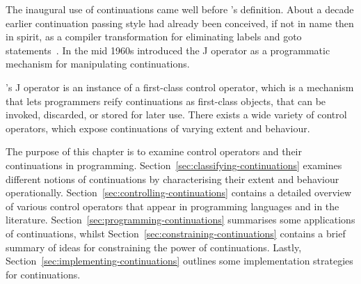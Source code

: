 \documentclass[12pt,phd,lfcs,twoside,openright,logo,leftchapter,normalheadings]{infthesis}
\theoremstyle{plain}
\theoremstyle{definition}
\begin{document}
The inaugural use of continuations came well before
\citeauthor{StracheyW00}'s definition. About a decade earlier
continuation passing style had already been conceived, if not in name
then in spirit, as a compiler transformation for eliminating labels
and goto statements~\cite{Reynolds93}. In the mid 1960s
\citet{Landin98} introduced the J operator as a programmatic mechanism
for manipulating continuations.

\citeauthor{Landin98}'s J operator is an instance of a first-class
control operator, which is a mechanism that lets programmers reify
continuations as first-class objects, that can be invoked, discarded,
or stored for later use. There exists a wide variety of control
operators, which expose continuations of varying extent and behaviour.

The purpose of this chapter is to examine control operators and their
continuations in
programming. Section~\ref{sec:classifying-continuations} examines
different notions of continuations by characterising their extent and
behaviour operationally. Section~\ref{sec:controlling-continuations}
contains a detailed overview of various control operators that appear
in programming languages and in the
literature. Section~\ref{sec:programming-continuations} summarises
some applications of continuations, whilst
Section~\ref{sec:constraining-continuations} contains a brief summary
of ideas for constraining the power of continuations. Lastly,
Section~\ref{sec:implementing-continuations} outlines some
implementation strategies for continuations.





%
\end{document}
